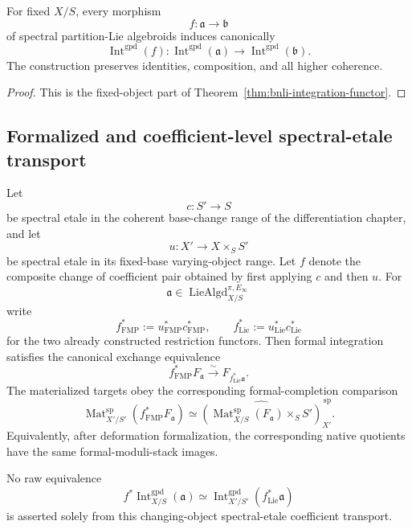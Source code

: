\begin{proposition}
\label{prop:bnli-fixed-object-functoriality}
For fixed \(X/S\), every morphism
\[
    f:\mathfrak a\longrightarrow\mathfrak b
\]
of spectral partition-Lie algebroids induces canonically
\[
    \operatorname{Int}^{\mathrm{gpd}}(f):
    \operatorname{Int}^{\mathrm{gpd}}(\mathfrak a)
    \longrightarrow
    \operatorname{Int}^{\mathrm{gpd}}(\mathfrak b).
\]
The construction preserves identities, composition, and all higher coherence.
\end{proposition}

\begin{proof}
This is the fixed-object part of
Theorem~\ref{thm:bnli-integration-functor}.
\end{proof}

\subsection{Formalized and coefficient-level spectral-etale transport}

\begin{proposition}
\label{prop:bnli-etale-formalized-transport}
Let
\[
    c:S'\longrightarrow S
\]
be spectral etale in the coherent base-change range of the differentiation
chapter, and let
\[
    u:X'\longrightarrow X\times_SS'
\]
be spectral etale in its fixed-base varying-object range.  Let $f$ denote the
composite change of coefficient pair obtained by first applying $c$ and then
$u$.  For
\[
    \mathfrak a\in
    \operatorname{LieAlgd}^{\pi,E_\infty}_{X/S}
\]
write
\[
    f_{\mathrm{FMP}}^*
    :=u_{\mathrm{FMP}}^*c_{\mathrm{FMP}}^*,
    \qquad
    f_{\mathrm{Lie}}^*
    :=u_{\mathrm{Lie}}^*c_{\mathrm{Lie}}^*
\]
for the two already constructed restriction functors.  Then formal integration
satisfies the canonical exchange equivalence
\[
\boxed{
    f_{\mathrm{FMP}}^*F_{\mathfrak a}
    \xrightarrow{\sim}
    F_{f_{\mathrm{Lie}}^*\mathfrak a}.}
\]
The materialized targets obey the corresponding formal-completion comparison
\[
\boxed{
    \operatorname{Mat}^{\mathrm{sp}}_{X'/S'}
    \left(f_{\mathrm{FMP}}^*F_{\mathfrak a}\right)
    \simeq
    \widehat{
      \left(
        \operatorname{Mat}^{\mathrm{sp}}_{X/S}(F_{\mathfrak a})
        \times_SS'
      \right)
    }^{\,\mathrm{sp}}_{X'}.}
\]
Equivalently, after deformation formalization, the corresponding native
quotients have the same formal-moduli-stack images.

No raw equivalence
\[
    f^*\operatorname{Int}^{\mathrm{gpd}}_{X/S}(\mathfrak a)
    \simeq
    \operatorname{Int}^{\mathrm{gpd}}_{X'/S'}
    (f_{\mathrm{Lie}}^*\mathfrak a)
\]
is asserted solely from this changing-object spectral-etale coefficient
transport.
\end{proposition}

